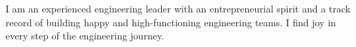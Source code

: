 \begin{cvparagraph}

\vspace*{.5cm}
I am an experienced engineering leader with an entrepreneurial spirit and a track record of building happy and high-functioning engineering teams. I find joy in every step of the engineering journey.
\end{cvparagraph}